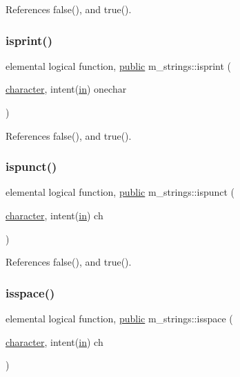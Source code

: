 References false(), and true().

\mbox{\label{namespacem__strings_a267f2fde729a75496c82a64754a91e54}} 
\subsubsection{\texorpdfstring{isprint()}{isprint()}}
{\footnotesize\ttfamily elemental logical function, \hyperlink{M__stopwatch_83_8txt_a2f74811300c361e53b430611a7d1769f}{public} m\+\_\+strings\+::isprint (\begin{DoxyParamCaption}\item[{\hyperlink{option__stopwatch_83_8txt_abd4b21fbbd175834027b5224bfe97e66}{character}, intent(\hyperlink{M__journal_83_8txt_afce72651d1eed785a2132bee863b2f38}{in})}]{onechar }\end{DoxyParamCaption})}



References false(), and true().

\mbox{\label{namespacem__strings_a8712164e1f5fd717bdea854a3f067619}} 
\subsubsection{\texorpdfstring{ispunct()}{ispunct()}}
{\footnotesize\ttfamily elemental logical function, \hyperlink{M__stopwatch_83_8txt_a2f74811300c361e53b430611a7d1769f}{public} m\+\_\+strings\+::ispunct (\begin{DoxyParamCaption}\item[{\hyperlink{option__stopwatch_83_8txt_abd4b21fbbd175834027b5224bfe97e66}{character}, intent(\hyperlink{M__journal_83_8txt_afce72651d1eed785a2132bee863b2f38}{in})}]{ch }\end{DoxyParamCaption})}



References false(), and true().

\mbox{\label{namespacem__strings_ab32380c29451e56395153155c1632d74}} 
\subsubsection{\texorpdfstring{isspace()}{isspace()}}
{\footnotesize\ttfamily elemental logical function, \hyperlink{M__stopwatch_83_8txt_a2f74811300c361e53b430611a7d1769f}{public} m\+\_\+strings\+::isspace (\begin{DoxyParamCaption}\item[{\hyperlink{option__stopwatch_83_8txt_abd4b21fbbd175834027b5224bfe97e66}{character}, intent(\hyperlink{M__journal_83_8txt_afce72651d1eed785a2132bee863b2f38}{in})}]{ch }\end{DoxyParamCaption})}




